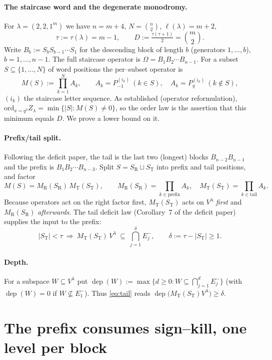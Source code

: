 \documentclass[11pt]{article}
\theoremstyle{definition}
\DeclareMathOperator{\dep}{dep}
\newcommand{\Vlam}{V^\lambda}
\newcommand{\Em}[1]{E^{-}_{#1}}
\newcommand{\Pq}{P_{q}}
\newcommand{\Pm}{P_{-1}}
\newcommand{\St}{S_{\mathrm T}}
\newcommand{\Sr}{S_{\mathrm R}}
\begin{document}
\paragraph{The staircase word and the degenerate monodromy.}
For $\lambda=(2,2,1^m)$ we have $n=m+4$, $N=\binom n2$, $\ell(\lambda)=m+2$,
\[
   \tau:=\tau(\lambda)=m-1,\qquad D:=\tfrac{\tau(\tau+1)}2=\binom m2 .
\]
Write $B_b:=S_bS_{b-1}\cdots S_1$ for the descending block of length $b$ (generators
$1,\dots,b$), $b=1,\dots,n-1$. The full staircase operator is
$\Omega=B_1B_2\cdots B_{n-1}$. For a subset $S\subseteq\{1,\dots,N\}$ of word positions the
per--subset operator is
\[
   M(S):=\prod_{k=1}^{N}A_k,\qquad A_k=\Pm^{(i_k)}\ (k\in S),\quad A_k=\Pq^{(i_k)}\ (k\notin S),
\]
$(i_k)$ the staircase letter sequence. As established (operator reformulation),
$\mathrm{ord}_{x=q^2}Z_\lambda=\min\{|S|:M(S)\neq0\}$, so the order law is the assertion that
this minimum equals $D$. We prove a lower bound on it.

\paragraph{Prefix/tail split.}
Following the deficit paper, the tail is the last two (longest) blocks
$B_{n-2}B_{n-1}$ and the prefix is $B_1B_2\cdots B_{n-3}$. Split $S=\Sr\sqcup\St$ into prefix
and tail positions, and factor
\[
   M(S)=M_{\mathrm R}(\Sr)\,M_{\mathrm T}(\St),\qquad
   M_{\mathrm R}(\Sr)=\!\!\prod_{k\in\text{prefix}}\!\!A_k,\quad
   M_{\mathrm T}(\St)=\!\!\prod_{k\in\text{tail}}\!\!A_k .
\]
Because operators act on the right factor first, $M_{\mathrm T}(\St)$ acts on $\Vlam$
\emph{first} and $M_{\mathrm R}(\Sr)$ \emph{afterwards}. The tail deficit law (Corollary~7 of
the deficit paper) supplies the input to the prefix:
\begin{equation}\label{eq:tail}
   |\St|<\tau\ \Longrightarrow\
   M_{\mathrm T}(\St)\,\Vlam\ \subseteq\ \bigcap_{j=1}^{\delta}\Em j,
   \qquad \delta:=\tau-|\St|\ge1 .
\end{equation}

\paragraph{Depth.}
For a subspace $W\subseteq\Vlam$ put
$\dep(W):=\max\{d\ge0: W\subseteq\bigcap_{j=1}^{d}\Em j\}$ (with $\dep(W)=0$ if
$W\not\subseteq\Em1$). Thus \eqref{eq:tail} reads $\dep\big(M_{\mathrm T}(\St)\Vlam\big)\ge\delta$.

\section{The prefix consumes sign--kill, one level per block}\label{sec:engine}
\end{document}
